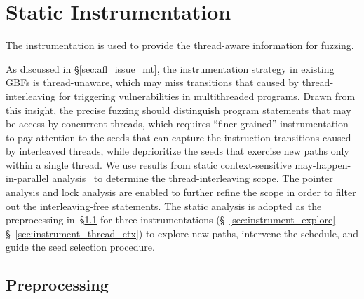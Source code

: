 \section{Static Instrumentation}\label{sec:instrument}
The instrumentation is used to provide the thread-aware information for fuzzing.

As discussed in \S\ref{sec:afl_issue_mt}, the instrumentation strategy in existing GBFs is thread-unaware, which may miss transitions that caused by thread-interleaving for triggering vulnerabilities in multithreaded programs. Drawn from this insight, the precise fuzzing should distinguish program statements that may be access by concurrent threads, which requires ``finer-grained'' instrumentation to pay attention to the seeds that can capture the instruction transitions caused by interleaved threads, while deprioritize the seeds that exercise new paths only within a single thread.
We use results from static context-sensitive may-happen-in-parallel analysis~\cite{DBLP:conf/cgo/SuiDX16} to determine the thread-interleaving scope. The pointer analysis and lock analysis are enabled to further refine the scope in order to filter out the interleaving-free statements.
The static analysis is adopted as the preprocessing in~\S\ref{sec:preprocess} for three instrumentations (\S~\ref{sec:instrument_explore}-\S~\ref{sec:instrument_thread_ctx}) to explore new paths, intervene the schedule, and  guide the seed selection procedure. 


\subsection{Preprocessing}\label{sec:preprocess}

